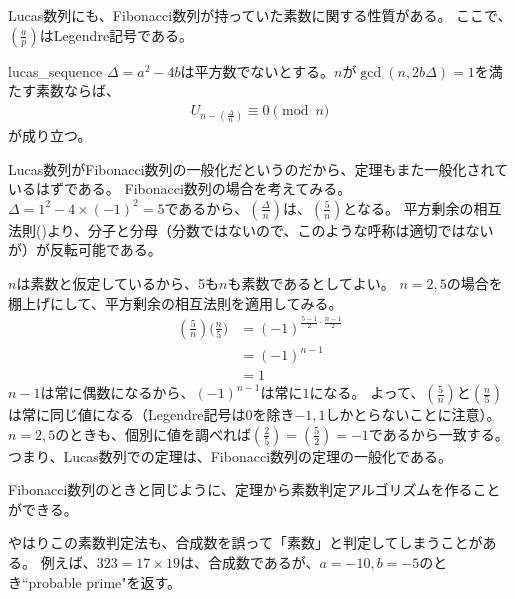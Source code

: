 Lucas数列にも、Fibonacci数列が持っていた素数に関する性質がある。
ここで、$\left(\frac{a}{p}\right)$はLegendre記号である。

\begin{Theo}{}{lucas_sequence}
$\Delta=a^2-4b$は平方数でないとする。$n$が$\gcd(n, 2b\Delta)=1$を満たす素数ならば、
\begin{align*}
U_{n - \left(\frac{\Delta}{n}\right)} \equiv 0 \pmod{n}
\end{align*}
が成り立つ。
\end{Theo}

Lucas数列がFibonacci数列の一般化だというのだから、定理もまた一般化されているはずである。
Fibonacci数列の場合を考えてみる。
$\Delta = 1^2-4\times(-1)^2=5$であるから、$\left(\frac{\Delta}{n}\right)$は、$\left(\frac{5}{n}\right)$となる。
平方剰余の相互法則()より、分子と分母（分数ではないので、このような呼称は適切ではないが）が反転可能である。

$n$は素数と仮定しているから、5も$n$も素数であるとしてよい。
$n=2, 5$の場合を棚上げにして、平方剰余の相互法則を適用してみる。
\begin{align*}
\left(\frac{5}{n}\right) \bigg(\frac{n}{5}\bigg) &= (-1)^{\frac{5-1}{2}\cdot\frac{n-1}{2}}\\
&= (-1)^{n-1}\\
&= 1
\end{align*}
$n-1$は常に偶数になるから、$(-1)^{n-1}$は常に$1$になる。
よって、$\left(\frac{5}{n}\right)$と$\left(\frac{n}{5}\right)$は常に同じ値になる（Legendre記号は$0$を除き$-1,1$しかとらないことに注意）。
$n=2, 5$のときも、個別に値を調べれば$\left(\frac{2}{5}\right) = \left(\frac{5}{2}\right) = -1$であるから一致する。
つまり、Lucas数列での定理は、Fibonacci数列の定理の一般化である。

Fibonacci数列のときと同じように、定理から素数判定アルゴリズムを作ることができる。


やはりこの素数判定法も、合成数を誤って「素数」と判定してしまうことがある。
例えば、$323=17\times19$は、合成数であるが、$a=-10,b=-5$のとき``probable prime"を返す。

